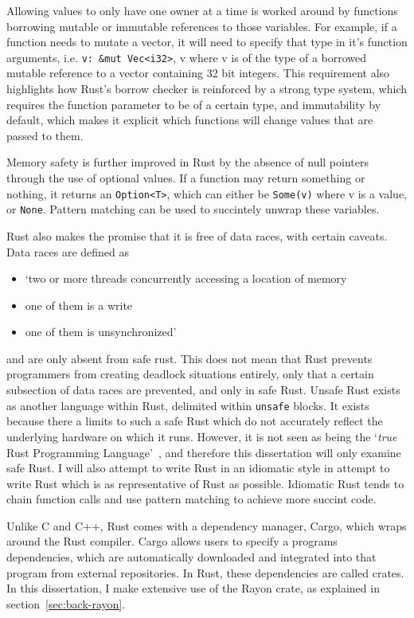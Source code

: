 Allowing values to only have one owner at a time is worked around by functions borrowing mutable or immutable references to those variables. For example, if a function needs to mutate a vector, it will need to specify that type in it's function arguments, i.e. \texttt{v: \&mut Vec<i32>}, v where v is of the type of a borrowed mutable reference to a vector containing 32 bit integers.
This requirement also highlights how Rust's borrow checker is reinforced by a strong type system, which requires the function parameter to be of a certain type, and immutability by default, which makes it explicit which functions will change values that are passed to them.

Memory safety is further improved in Rust by the absence of null pointers through the use of optional values. If a function may return something or nothing, it returns an \texttt{Option<T>}, which can either be \texttt{Some(v)} where v is a value, or \texttt{None}. Pattern matching can be used to succintely unwrap these variables.

Rust also makes the promise that it is free of data races, with certain caveats. Data races are defined as 
\begin{itemize}
    \item `two or more threads concurrently accessing a location of memory
    \item one of them is a write
    \item one of them is unsynchronized'~\cite{NomRace}
\end{itemize}

and are only absent from safe rust. This does not mean that Rust prevents programmers from creating deadlock situations entirely, only that a certain subsection of data races are prevented, and only in safe Rust. Unsafe Rust exists as another language within Rust, delimited within \texttt{unsafe} blocks. It exists because there a limits to such a safe Rust which do not accurately reflect the underlying hardware on which it runs. However, it is not seen as being the `\textit{true} Rust Programming Language'~\cite{NomSafe}, and therefore this dissertation will only examine safe Rust. I will also attempt to write Rust in an idiomatic style in attempt to write Rust which is as representative of Rust as possible. Idiomatic Rust tends to chain function calls and use pattern matching to achieve more succint code.

Unlike C and C++, Rust comes with a dependency manager, Cargo, which wraps around the Rust compiler. Cargo allows users to specify a programs dependencies, which are automatically downloaded and integrated into that program from external repositories. In Rust, these dependencies are called crates. In this dissertation, I make extensive use of the Rayon crate, as explained in section~\ref{sec:back-rayon}.

